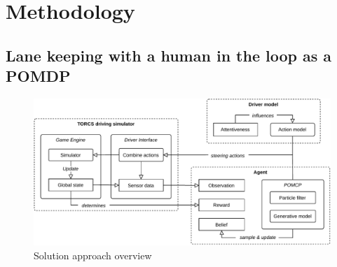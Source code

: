 \chapter{Methodology}
\label{sec:problem}



\section{Lane keeping with a human in the loop as a POMDP}

\begin{figure}[ht]
    \centerfloat
    \includegraphics[width=1.2\linewidth]{figures/Components.pdf}
    \caption{Solution approach overview}
    \label{fig:overview}
\end{figure}

